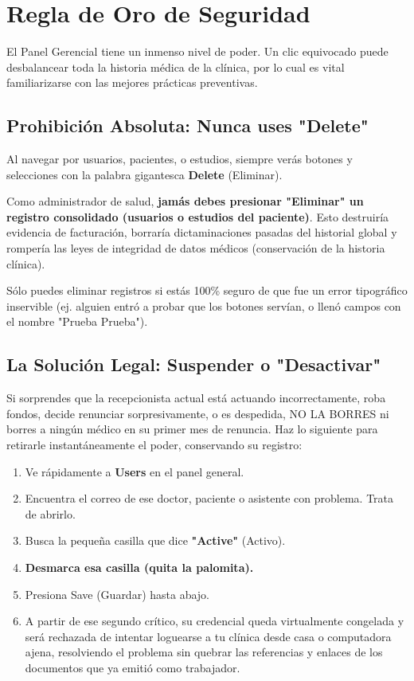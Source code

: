 \section{Regla de Oro de Seguridad}

El Panel Gerencial tiene un inmenso nivel de poder. Un clic equivocado puede desbalancear toda la historia médica de la clínica, por lo cual es vital familiarizarse con las mejores prácticas preventivas.

\subsection{Prohibición Absoluta: Nunca uses "Delete"}

Al navegar por usuarios, pacientes, o estudios, siempre verás botones y selecciones con la palabra gigantesca \textbf{Delete} (Eliminar).

Como administrador de salud, \textbf{jamás debes presionar "Eliminar" un registro consolidado (usuarios o estudios del paciente)}. Esto destruiría evidencia de facturación, borraría dictaminaciones pasadas del historial global y rompería las leyes de integridad de datos médicos (conservación de la historia clínica).

Sólo puedes eliminar registros si estás 100\% seguro de que fue un error tipográfico inservible (ej. alguien entró a probar que los botones servían, o llenó campos con el nombre "Prueba Prueba").

\subsection{La Solución Legal: Suspender o "Desactivar"}

Si sorprendes que la recepcionista actual está actuando incorrectamente, roba fondos, decide renunciar sorpresivamente, o es despedida, NO LA BORRES ni borres a ningún médico en su primer mes de renuncia. Haz lo siguiente para retirarle instantáneamente el poder, conservando su registro:

\begin{enumerate}
    \item Ve rápidamente a \textbf{Users} en el panel general.
    \item Encuentra el correo de ese doctor, paciente o asistente con problema. Trata de abrirlo.
    \item Busca la pequeña casilla que dice \textbf{"Active"} (Activo).
    \item \textbf{Desmarca esa casilla (quita la palomita).}
    \item Presiona Save (Guardar) hasta abajo.
    \item A partir de ese segundo crítico, su credencial queda virtualmente congelada y será rechazada de intentar loguearse a tu clínica desde casa o computadora ajena, resolviendo el problema sin quebrar las referencias y enlaces de los documentos que ya emitió como trabajador.
\end{enumerate}


